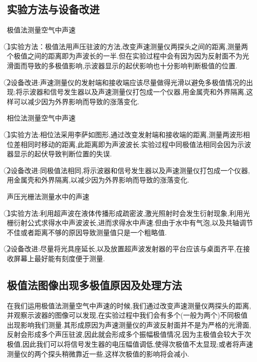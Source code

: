 \documentclass[a4 paper,12pt]{article}
\begin{document}
\subsection{实验方法与设备改进}
\begin{center}
极值法测量空气中声速
\end{center}
\par \textcircled{1}实验方法：极值法用声压驻波的方法,改变声速测量仪两探头之间的距离,测量两个极值之间的距离即为声波长的一半.但在实验过程中会有因为因为反射面不为光滑面而导致的多极值影响,示波器显示的起伏影响也十分影响判断极值的位置.\\
\par \textcircled{2}设备改进:声速测量仪的发射端和接收端应该尽量做得光滑以避免多极值情况的出现;将示波器和信号发生器以及声速测量仪打包成一个仪器,用金属壳和外界隔离,这样可以减少因为外界影响而导致的涨落变化.
\begin{center}
相位法测量空气中声速
\end{center}
\par \textcircled{1}实验方法:相位法采用李萨如图形,通过改变发射端和接收端的距离,测量两波形相位差相同时移动的距离,此距离即为声波波长.实验过程中同极值法相同会因为示波器显示的起伏导致判断位置的失误.\\
\par \textcircled{2}设备改进:同极值法相同,将示波器和信号发生器以及声速测量仪打包成一个仪器,用金属壳和外界隔离,以减少因为外界影响而导致的涨落变化.
\begin{center}
	声压光栅法测量水中的声速
\end{center}
\par \textcircled{1}实验方法:利用超声波在液体传播形成疏密波,激光照射时会发生衍射现象,利用光栅衍射公式求得水中声波波长,进而求得水中声速.但由于水中有气泡,以及共轴调节不佳或者距离不够的原因导致测量值只是一个粗略值.\\
\par \textcircled{2}设备改进:尽量将光具座延长,以及放置超声波发射器的平台应该与桌面齐平,在接收屏幕上最好能有刻度便于测量.
\subsection{极值法图像出现多极值原因及处理方法}
在我们运用极值法测量空气中声速的时候,我们通过改变声速测量仪两探头的距离,并观察示波器的图像可以发现,在实验过程中我们会有多个(一般为两个)不同极值出现影响我们测量.其形成原因为声速测量仪的声波反射面并不是为严格的光滑面,反射会形成多个声压驻波,因此就会形成多个振幅极值情况.因为主极值会较大于次极值,因此我们可以将信号发生器的电压幅值调低,使得次极值不太显现;或者将声速测量仪的两个探头稍微靠近一些,这样次极值的影响将会减小.
\end{document}
